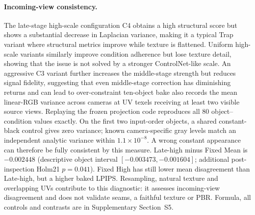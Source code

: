 \documentclass[times,twocolumn,final]{elsarticle}
\providecommand{\DIFadd}[1]{{\protect\color{blue} \sf #1}} %
\providecommand{\DIFdel}[1]{{\protect\color{red} \scriptsize #1}} %
\providecommand{\DIFaddbegin}{} %
\providecommand{\DIFaddend}{} %
\providecommand{\DIFdelbegin}{} %
\providecommand{\DIFdelend}{} %
\begin{document}
\paragraph{Incoming-view consistency.}
\DIFaddend The \DIFdelbegin \DIFdel{late-stage high-scale configuration C4 obtains a high structural score but shows a substantial decrease in Laplacian variance, making it a typical Trap variant where structural metrics improve while texture is flattened. Uniform high-scale variants similarly improve condition adherence but lose texture detail, showing that the issue is not solved by a stronger ControlNet-like scale. An aggressive C3 variant further increases the middle-stage strength but reduces signal fidelity, suggesting that even middle-stage correction has diminishing returns and can lead to over-constraint}\DIFdelend \DIFaddbegin \DIFadd{ten-object bake also records the mean linear-RGB variance across cameras at UV texels receiving at least two visible source views. Replaying the frozen projection code reproduces all 80 object--condition values exactly. On the first two input-order objects, a shared constant-black control gives zero variance; known camera-specific gray levels match an independent analytic variance within $1.1\times10^{-8}$. A wrong constant appearance can therefore be fully consistent by this measure. Late-high minus Fixed Mean is $-0.002448$ (descriptive object interval $[-0.003473,-0.001604]$; additional post-inspection Holm21 $p=0.041$). Fixed High has still lower mean disagreement than Late-high, but a higher baked LPIPS. Resampling, natural texture and overlapping UVs contribute to this diagnostic: it assesses incoming-view disagreement and does not validate seams, a faithful texture or PBR. Formula, all controls and contrasts are in Supplementary Section~S5}\DIFaddend .

\DIFdelbegin %
\end{document}
